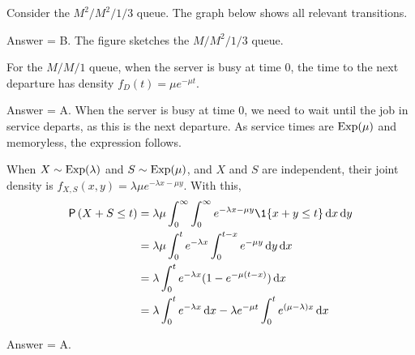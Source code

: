 \begin{exercise}[201804]
 Consider the $M^2/M^2/1/3$ queue. The graph below shows all relevant transitions.

 \begin{center}
 \end{center}
\begin{solution}
Answer = B. The figure sketches the $M/M^2/1/3$ queue.
\end{solution}
\end{exercise}

\begin{exercise}[201804]
For the $M/M/1$ queue, when the server is busy at time $0$, the time to the next departure has density $f_D(t) = \mu e^{-\mu t}$.
\begin{solution}
Answer = A. When the server is busy at time $0$, we need to wait until the job in service departs, as this is the next departure. As service times are $\operatorname{Exp}(\mu)$ and memoryless, the expression follows.
\end{solution}
\end{exercise}

\begin{exercise}[201804]
When $X\sim \operatorname{Exp}(\lambda)$ and $S\sim\operatorname{Exp}(\mu)$, and $X$ and $S$ are independent, their joint density is $f_{X,S}(x,y) = \lambda \mu e^{-\lambda x - \mu y}$. With this,
 \begin{align*}
\P{X+S\leq t } 
&= \lambda \mu \int_0^\infty \int_0^\infty e^{-\lambda x - \mu y} \1{x+y\leq t} \d x \d y \\
&= \lambda \mu \int_0^t e^{-\lambda x} \int_0^{t-x} e^{- \mu y} \d y \d x \\
&= \lambda \int_0^t e^{-\lambda x} (1-e^{- \mu (t-x)} ) \d x \\
&= \lambda \int_0^t e^{-\lambda x} \d x - \lambda e^{-\mu t} \int_0^t e^{(\mu-\lambda) x} \d x \\
 \end{align*}
\begin{solution}
Answer = A.
\end{solution}
\end{exercise}

